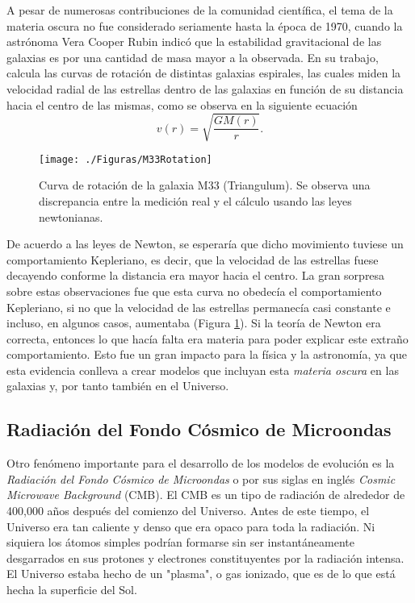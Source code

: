 \documentclass[a4paper,openright,12pt]{book}
\begin{document}
A pesar de numerosas contribuciones de la comunidad científica, el tema de la materia oscura no fue considerado seriamente hasta la época de 1970, cuando la astrónoma Vera Cooper Rubin \cite{1.1.2} indicó que la estabilidad gravitacional de las galaxias es por una cantidad de masa mayor a la observada. En su trabajo, calcula las curvas de rotación de distintas galaxias espirales, las cuales miden la velocidad radial de las estrellas dentro de las galaxias en función de su distancia hacia el centro de las mismas, como se observa en la siguiente ecuación
\begin{equation}
v (r)
=
\sqrt{\frac{G M (r)}{r}}.\label{eqn 1.42}
\end{equation} 
\begin{figure}
\centering
    \texttt{[image: ./Figuras/M33Rotation]}
  \caption{\footnotesize{Curva de rotación de la galaxia M33 (Triangulum). Se observa una discrepancia entre la medición real y el cálculo usando las leyes newtonianas.}}
  \label{fig 1.2}
\end{figure}
De acuerdo a las leyes de Newton, se esperaría que dicho movimiento tuviese un comportamiento Kepleriano, es decir, que la velocidad de las estrellas fuese decayendo conforme la distancia era mayor hacia el centro. La gran sorpresa sobre estas observaciones fue que esta curva no obedecía el comportamiento Kepleriano, si no que la velocidad de las estrellas permanecía casi constante e incluso, en algunos casos, aumentaba (Figura \ref{fig 1.2}). Si la teoría de Newton era correcta, entonces lo que hacía falta era materia para poder explicar este extraño comportamiento. Esto fue un gran impacto para la física y la astronomía, ya que esta evidencia conlleva a crear modelos que incluyan esta \textit{materia oscura} en las galaxias y, por tanto también en el Universo.

\subsection*{Radiación del Fondo Cósmico de Microondas}
Otro fenómeno importante para el desarrollo de los modelos de evolución es la \textit{Radiación del Fondo Cósmico de Microondas} o por sus siglas en inglés \textit{Cosmic Microwave Background} (CMB). El CMB es un tipo de radiación de alrededor de 400,000 años después del comienzo del Universo. Antes de este tiempo, el Universo era tan caliente y denso que era opaco para toda la radiación. Ni siquiera los átomos simples podrían formarse sin ser instantáneamente desgarrados en sus protones y electrones constituyentes por la radiación intensa. El Universo estaba hecho de un "plasma", o gas ionizado, que es de lo que está hecha la superficie del Sol.
\end{document}
